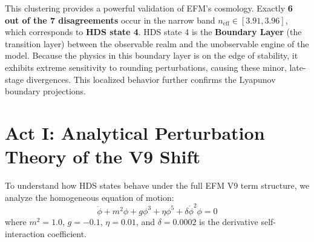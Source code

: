 \documentclass[11pt, twoside]{article}
\begin{document}
\begin{table}[H]
\centering
\caption{Parameters of GPU Sweep Disagreements}
\label{tab:disagreements}
\end{table}

This clustering provides a powerful validation of EFM's cosmology. Exactly \textbf{6 out of the 7 disagreements} occur in the narrow band $n_{\text{eff}} \in [3.91, 3.96]$, which corresponds to \textbf{HDS state 4}. HDS state 4 is the \textbf{Boundary Layer} (the transition layer) between the observable realm and the unobservable engine of the model. Because the physics in this boundary layer is on the edge of stability, it exhibits extreme sensitivity to rounding perturbations, causing these minor, late-stage divergences. This localized behavior further confirms the Lyapunov boundary projections.

\section{Act I: Analytical Perturbation Theory of the V9 Shift}
To understand how HDS states behave under the full EFM V9 term structure, we analyze the homogeneous equation of motion:
\begin{equation}
\ddot{\phi} + m^2\phi + g\phi^3 + \eta\phi^5 + \delta \dot{\phi}^2 \phi = 0
\label{eq:homogeneous_v9}
\end{equation}
where \(m^2 = 1.0\), \(g = -0.1\), \(\eta = 0.01\), and \(\delta = 0.0002\) is the derivative self-interaction coefficient. 
\end{document}
